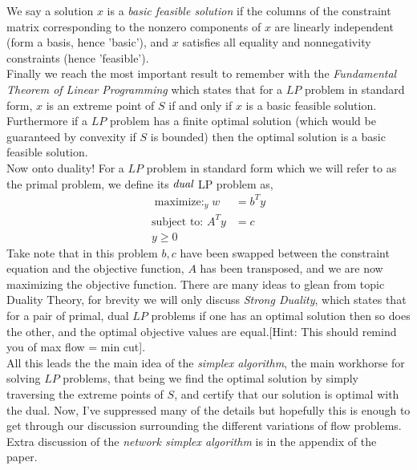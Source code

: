 \documentclass[12pt]{amsart}
\begin{document}
    
    We say a solution $x$ is a \emph{basic feasible solution} if the columns of the constraint matrix corresponding to the nonzero components of $x$ are linearly independent (form a basis, hence 'basic'), and $x$ satisfies all equality and nonnegativity constraints (hence 'feasible').\\

     Finally we reach the most important result to remember with the \emph{Fundamental Theorem of Linear Programming} which states that for a $LP$ problem in standard form, $x$ is an extreme point of $S$ if and only if $x$ is a basic feasible solution. Furthermore if a $LP$ problem has a finite optimal solution (which would be guaranteed by convexity if $S$ is bounded) then the optimal solution is a basic feasible solution. \\
    
    Now onto duality! For a $LP$ problem in standard form which we will refer to as the primal problem, we define its $\emph{dual}$ LP problem as, 
    \begin{align*}
        \mathop{\text{maximize: }}_{y}  w &= b^Ty\\
      \text{subject to: }A^Ty &= c\\
      y\geq 0
    \end{align*} 
    Take note that in this problem $b, c$ have been swapped between the constraint equation and the objective function, $A$ has been transposed, and we are now maximizing the objective function. There are many ideas to glean from topic Duality Theory, for brevity we will only discuss \emph{Strong Duality}, which states that for a pair of primal, dual $LP$ problems if one has an optimal solution then so does the other, and the optimal objective values are equal.[Hint: This should remind you of max flow = min cut]. \\

    All this leads the the main idea of the \emph{simplex algorithm}, the main workhorse for solving $LP$ problems, that being we find the optimal solution by simply traversing the extreme points of $S$, and certify that our solution is optimal with the dual. Now, I've suppressed many of the details but hopefully this is enough to get through our discussion surrounding the different variations of flow problems. Extra discussion of the \emph{network simplex algorithm} is in the appendix of the paper.
\end{document}
